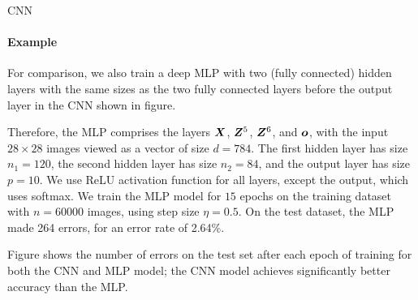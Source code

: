 \begin{frame}{CNN}
\framesubtitle{Example}
    
    For comparison, we also train a deep MLP with two (fully
    connected) hidden layers with the same sizes as the two fully
    connected layers before the output layer in the CNN shown in
    figure. 

\medskip

Therefore, the MLP comprises the layers
    ${\boldsymbol X}$, ${\boldsymbol Z}^5$, ${\boldsymbol Z}^6$, and ${\boldsymbol o}$, with the input $28\times28$
    images viewed as a vector of size $d=784$. The first hidden layer
    has size $n_1 = 120$, the second hidden layer has size $n_2=84$, and
    the output layer has size $p=10$. We use ReLU activation function
    for all layers, except the output, which uses softmax. We train the
    MLP model for $15$ epochs on the training dataset with $n=60000$
    images, using step size $\eta=0.5$. On the test dataset, the MLP
    made 264 errors, for an error rate of 2.64\%.


\medskip

Figure shows the number of errors on the
    test set after each epoch of training for both the CNN and MLP
    model; the CNN model achieves significantly
    better accuracy than the MLP.
\end{frame}
%
